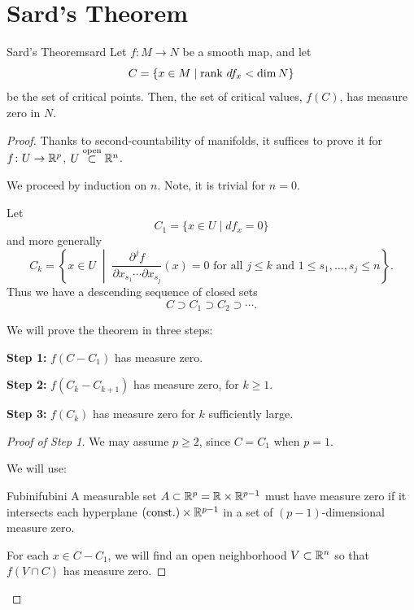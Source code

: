 
\section{Sard's Theorem}

\begin{theorem}{Sard's Theorem}{sard}
    Let $f \colon M \to N$ be a smooth map, and let
    \[
        C = \{x \in M \mid \operatorname{rank}\, df_x < \dim N\}
    \]
    be the set of critical points. Then, the set of critical values, $f(C)$, has measure zero in $N$.
\end{theorem}

\begin{proof}
    Thanks to second-countability of manifolds, it suffices to prove it for $f \colon U \to \mathbb{R}^p$, $U \overset{\text{open}}{\subset} \mathbb{R}^n$.

    We proceed by induction on $n$. Note, it is trivial for $n = 0$.

    Let
    \[
        C_1 = \{x \in U \mid df_x = 0\}
    \]
    and more generally
    \[
        C_k = \left\{x \in U \;\middle|\; \frac{\partial^j f}{\partial x_{s_1} \cdots \partial x_{s_j}}(x) = 0 \text{ for all } j \leq k \text{ and } 1 \leq s_1, \ldots, s_j \leq n\right\}.
    \]
    Thus we have a descending sequence of closed sets
    \[
        C \supset C_1 \supset C_2 \supset \cdots.
    \]

    We will prove the theorem in three steps:

    \textbf{Step 1:} $f(C - C_1)$ has measure zero.

    \textbf{Step 2:} $f(C_k - C_{k+1})$ has measure zero, for $k \geq 1$.

    \textbf{Step 3:} $f(C_k)$ has measure zero for $k$ sufficiently large.

    \begin{proof}[Proof of Step 1]
        We may assume $p \geq 2$, since $C = C_1$ when $p = 1$.

        We will use:
        \begin{theorem}{Fubini}{fubini}
            A measurable set $A \subset \mathbb{R}^p = \mathbb{R} \times \mathbb{R}^{p-1}$ must have measure zero if it intersects each hyperplane $(\text{const.}) \times \mathbb{R}^{p-1}$ in a set of $(p-1)$-dimensional measure zero.
        \end{theorem}

        For each $x \in C - C_1$, we will find an open neighborhood $V \subset \mathbb{R}^n$ so that $f(V \cap C)$ has measure zero.


\end{proof}
\end{proof}
